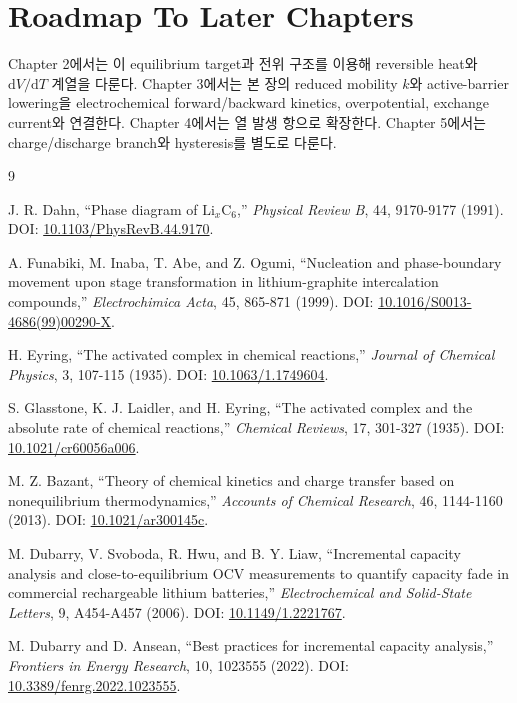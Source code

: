 \documentclass[11pt,a4paper]{article}
\newcommand{\dd}{\mathrm{d}}
\begin{document}
\section{Roadmap To Later Chapters}

Chapter 2에서는 이 equilibrium target과 전위 구조를 이용해 reversible heat와 \(\dd V/\dd T\) 계열을 다룬다. Chapter 3에서는 본 장의 reduced mobility \(k\)와 active-barrier lowering을 electrochemical forward/backward kinetics, overpotential, exchange current와 연결한다. Chapter 4에서는 열 발생 항으로 확장한다. Chapter 5에서는 charge/discharge branch와 hysteresis를 별도로 다룬다.

\begin{thebibliography}{9}

J. R. Dahn, ``Phase diagram of \(\mathrm{Li}_x\mathrm{C}_6\),'' \textit{Physical Review B}, 44, 9170-9177 (1991). DOI: \href{https://doi.org/10.1103/PhysRevB.44.9170}{10.1103/PhysRevB.44.9170}.

A. Funabiki, M. Inaba, T. Abe, and Z. Ogumi, ``Nucleation and phase-boundary movement upon stage transformation in lithium-graphite intercalation compounds,'' \textit{Electrochimica Acta}, 45, 865-871 (1999). DOI: \href{https://doi.org/10.1016/S0013-4686(99)00290-X}{10.1016/S0013-4686(99)00290-X}.

H. Eyring, ``The activated complex in chemical reactions,'' \textit{Journal of Chemical Physics}, 3, 107-115 (1935). DOI: \href{https://doi.org/10.1063/1.1749604}{10.1063/1.1749604}.

S. Glasstone, K. J. Laidler, and H. Eyring, ``The activated complex and the absolute rate of chemical reactions,'' \textit{Chemical Reviews}, 17, 301-327 (1935). DOI: \href{https://doi.org/10.1021/cr60056a006}{10.1021/cr60056a006}.

M. Z. Bazant, ``Theory of chemical kinetics and charge transfer based on nonequilibrium thermodynamics,'' \textit{Accounts of Chemical Research}, 46, 1144-1160 (2013). DOI: \href{https://doi.org/10.1021/ar300145c}{10.1021/ar300145c}.

M. Dubarry, V. Svoboda, R. Hwu, and B. Y. Liaw, ``Incremental capacity analysis and close-to-equilibrium OCV measurements to quantify capacity fade in commercial rechargeable lithium batteries,'' \textit{Electrochemical and Solid-State Letters}, 9, A454-A457 (2006). DOI: \href{https://doi.org/10.1149/1.2221767}{10.1149/1.2221767}.

M. Dubarry and D. Ansean, ``Best practices for incremental capacity analysis,'' \textit{Frontiers in Energy Research}, 10, 1023555 (2022). DOI: \href{https://doi.org/10.3389/fenrg.2022.1023555}{10.3389/fenrg.2022.1023555}.

\end{thebibliography}
\end{document}

